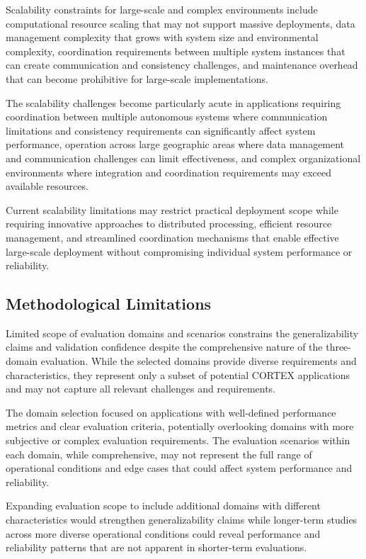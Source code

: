 Scalability constraints for large-scale and complex environments include computational resource scaling that may not support massive deployments, data management complexity that grows with system size and environmental complexity, coordination requirements between multiple system instances that can create communication and consistency challenges, and maintenance overhead that can become prohibitive for large-scale implementations.

The scalability challenges become particularly acute in applications requiring coordination between multiple autonomous systems where communication limitations and consistency requirements can significantly affect system performance, operation across large geographic areas where data management and communication challenges can limit effectiveness, and complex organizational environments where integration and coordination requirements may exceed available resources.

Current scalability limitations may restrict practical deployment scope while requiring innovative approaches to distributed processing, efficient resource management, and streamlined coordination mechanisms that enable effective large-scale deployment without compromising individual system performance or reliability.

\subsection{Methodological Limitations}

Limited scope of evaluation domains and scenarios constrains the generalizability claims and validation confidence despite the comprehensive nature of the three-domain evaluation. While the selected domains provide diverse requirements and characteristics, they represent only a subset of potential CORTEX applications and may not capture all relevant challenges and requirements.

The domain selection focused on applications with well-defined performance metrics and clear evaluation criteria, potentially overlooking domains with more subjective or complex evaluation requirements. The evaluation scenarios within each domain, while comprehensive, may not represent the full range of operational conditions and edge cases that could affect system performance and reliability.

Expanding evaluation scope to include additional domains with different characteristics would strengthen generalizability claims while longer-term studies across more diverse operational conditions could reveal performance and reliability patterns that are not apparent in shorter-term evaluations.


